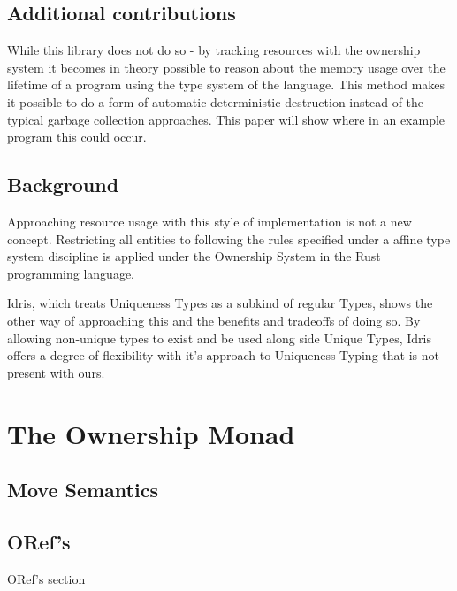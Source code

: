 \documentclass[onehalf,11pt]{beavtex}
\begin{document}
\section{Additional contributions}

While this library does not do so - by tracking resources with the ownership
system it becomes in theory possible to reason about the memory usage over the
lifetime of a program using the type system of the language. 
This method makes it possible to do a form of automatic deterministic destruction
instead of the typical garbage collection approaches.  This paper will show
where in an example program this could occur.


\section{Background}

Approaching resource usage with this style of implementation is not a new
concept.
Restricting all entities to following the rules specified under a affine type
system discipline is applied under the Ownership System in the Rust
programming language. 

Idris, which treats Uniqueness Types as a subkind of regular Types, shows
the other way of approaching this and the benefits and tradeoffs of doing so.
By allowing non-unique types to exist and be used along side Unique Types,
Idris offers a degree of flexibility with it's approach to Uniqueness
Typing that is not present with ours. %



\chapter{The Ownership Monad}
\section{Move Semantics}
\section{ORef's}
ORef's section




{}

\end{document}
